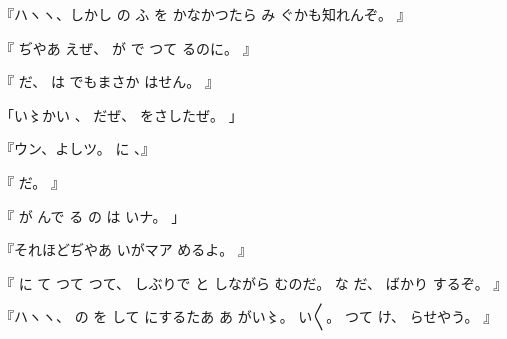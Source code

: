 『ハヽヽ、しかし
の
ふ
を
かなかつたら
み
ぐかも知れんぞ。
』

『
ぢやあ
えぜ、
が
で
つて
るのに。
』

『
だ、
は
でもまさか
はせん。
』

「い〻かい
、
だぜ、
をさしたぜ。
」

『ウン、よしツ。
に
、』

『
だ。
』

『
が
んで
る
の
は
いナ。
」

『それほどぢやあ
いがマア
めるよ。
』

『
に
て
つて
つて、
しぶりで
と
しながら
むのだ。
な
だ、
ばかり
するぞ。
』

『ハヽヽ、
の
を
して
にするたあ
あ
がい〻。
い〳〵。
つて
け、
らせやう。
』


